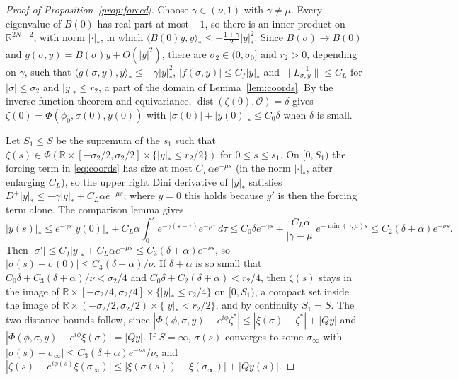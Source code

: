 \documentclass[11pt]{article}
\theoremstyle{definition}
\newcommand{\R}{\mathbb{R}}
\begin{document}
\begin{proof}[Proof of Proposition~\ref{prop:forced}]
Choose $\gamma \in (\nu, 1)$ with $\gamma \ne \mu$. Every eigenvalue of $B(0)$ has real part at most $-1$, so there is an inner product on $\R^{2N-2}$, with norm $|\cdot|_*$, in which $\langle B(0)y, y\rangle_* \le -\frac{1 + \gamma}{2}|y|_*^2$. Since $B(\sigma) \to B(0)$ and $g(\sigma, y) = B(\sigma)y + O(|y|^2)$, there are $\sigma_2 \in (0, \sigma_0]$ and $r_2 > 0$, depending on $\gamma$, such that $\langle g(\sigma, y), y\rangle_* \le -\gamma|y|_*^2$, $|f(\sigma, y)| \le C_f|y|_*$ and $\|L_{\sigma,y}^{-1}\| \le C_L$ for $|\sigma| \le \sigma_2$ and $|y|_* \le r_2$, a part of the domain of Lemma~\ref{lem:coords}. By the inverse function theorem and equivariance, $\operatorname{dist}(\zeta(0), \mathcal O) = \delta$ gives $\zeta(0) = \Phi(\phi_0, \sigma(0), y(0))$ with $|\sigma(0)| + |y(0)|_* \le C_0\delta$ when $\delta$ is small.

Let $S_1 \le S$ be the supremum of the $s_1$ such that $\zeta(s) \in \Phi(\R \times [-\sigma_2/2, \sigma_2/2] \times \{|y|_* \le r_2/2\})$ for $0 \le s \le s_1$. On $[0, S_1)$ the forcing term in \eqref{eq:coords} has size at most $C_L\alpha e^{-\mu s}$ (in the norm $|\cdot|_*$, after enlarging $C_L$), so the upper right Dini derivative of $|y|_*$ satisfies $D^+|y|_* \le -\gamma|y|_* + C_L\alpha e^{-\mu s}$; where $y = 0$ this holds because $y'$ is then the forcing term alone. The comparison lemma gives
\[
  |y(s)|_* \le e^{-\gamma s}|y(0)|_* + C_L\alpha\int_0^se^{-\gamma(s - \tau)}e^{-\mu\tau}\,d\tau \le C_0\delta e^{-\gamma s} + \frac{C_L\alpha}{|\gamma - \mu|}e^{-\min(\gamma, \mu)s} \le C_2(\delta + \alpha)e^{-\nu s}.
\]
Then $|\sigma'| \le C_f|y|_* + C_L\alpha e^{-\mu s} \le C_3(\delta + \alpha)e^{-\nu s}$, so $|\sigma(s) - \sigma(0)| \le C_3(\delta + \alpha)/\nu$. If $\delta + \alpha$ is so small that $C_0\delta + C_3(\delta + \alpha)/\nu < \sigma_2/4$ and $C_0\delta + C_2(\delta + \alpha) < r_2/4$, then $\zeta(s)$ stays in the image of $\R \times [-\sigma_2/4, \sigma_2/4] \times \{|y|_* \le r_2/4\}$ on $[0, S_1)$, a compact set inside the image of $\R \times (-\sigma_2/2, \sigma_2/2) \times \{|y|_* < r_2/2\}$, and by continuity $S_1 = S$. The two distance bounds follow, since $|\Phi(\phi, \sigma, y) - e^{i\phi}\zeta^*| \le |\xi(\sigma) - \zeta^*| + |Qy|$ and $|\Phi(\phi, \sigma, y) - e^{i\phi}\xi(\sigma)| = |Qy|$. If $S = \infty$, $\sigma(s)$ converges to some $\sigma_\infty$ with $|\sigma(s) - \sigma_\infty| \le C_3(\delta + \alpha)e^{-\nu s}/\nu$, and $|\zeta(s) - e^{i\phi(s)}\xi(\sigma_\infty)| \le |\xi(\sigma(s)) - \xi(\sigma_\infty)| + |Qy(s)|$.


\end{proof}
\end{document}
